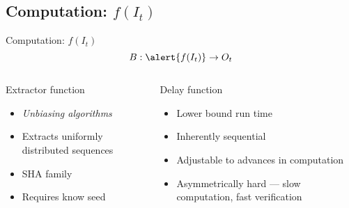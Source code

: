 \subsection{Computation: $f(I_t)$}

\begin{frame}{Computation: $f(I_t)$}
    \begin{equation*}
        B: \alert{f(I_t)} \rightarrow O_t
    \end{equation*}
    \begin{columns}
        \begin{column}{0.5\textwidth}
            Extractor function
            \begin{itemize}
                \item \textit{Unbiasing algorithms}
                \item Extracts uniformly distributed sequences
                \item SHA family
                \item Requires know seed
            \end{itemize}
        \end{column}
        \begin{column}{0.5\textwidth}
            Delay function
            \begin{itemize}
                \item Lower bound run time
                \item Inherently sequential
                \item Adjustable to advances in computation
                \item Asymmetrically hard --- slow computation, fast verification
            \end{itemize}
        \end{column}
    \end{columns}
\end{frame}

